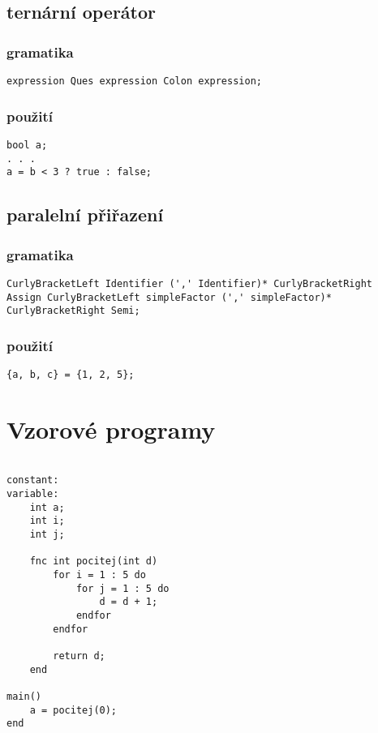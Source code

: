 \documentclass{style}
\begin{document}
\subsection{ternární operátor}
\subsubsection{gramatika}
\begin{lstlisting}
expression Ques expression Colon expression;
\end{lstlisting}

\subsubsection{použití}
\begin{lstlisting}
bool a;
. . .
a = b < 3 ? true : false;
\end{lstlisting}

\subsection{paralelní přiřazení}
\subsubsection{gramatika}
\begin{lstlisting}
CurlyBracketLeft Identifier (',' Identifier)* CurlyBracketRight
Assign CurlyBracketLeft simpleFactor (',' simpleFactor)*
CurlyBracketRight Semi;
\end{lstlisting}

\subsubsection{použití}
\begin{lstlisting}
{a, b, c} = {1, 2, 5};
\end{lstlisting}

\section{Vzorové programy}
\begin{minipage}{\linewidth}
\begin{lstlisting}[frame=single]  % Start your code-block

constant:
variable:
    int a;
    int i;
    int j;

    fnc int pocitej(int d)
        for i = 1 : 5 do
            for j = 1 : 5 do
                d = d + 1;
            endfor
        endfor

        return d;
    end

main()
    a = pocitej(0);
end
\end{lstlisting}
\end{minipage}
\end{document}
